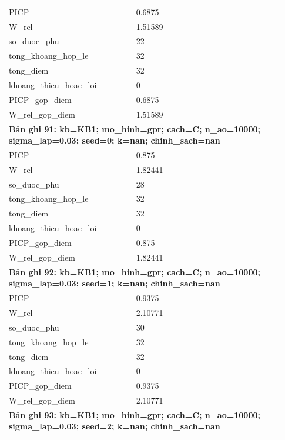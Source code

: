 \begin{longtable}{p{0.43\linewidth}p{0.50\linewidth}}
PICP & 0.6875 \\
W\_\allowbreak rel & 1.51589 \\
so\_\allowbreak duoc\_\allowbreak phu & 22 \\
tong\_\allowbreak khoang\_\allowbreak hop\_\allowbreak le & 32 \\
tong\_\allowbreak diem & 32 \\
khoang\_\allowbreak thieu\_\allowbreak hoac\_\allowbreak loi & 0 \\
PICP\_\allowbreak gop\_\allowbreak diem & 0.6875 \\
W\_\allowbreak rel\_\allowbreak gop\_\allowbreak diem & 1.51589 \\
\midrule
\multicolumn{2}{p{0.95\linewidth}}{\textbf{Bản ghi 91: kb=KB1; mo\_hinh=gpr; cach=C; n\_ao=10000; sigma\_lap=0.03; seed=0; k=nan; chinh\_sach=nan}} \\
PICP & 0.875 \\
W\_\allowbreak rel & 1.82441 \\
so\_\allowbreak duoc\_\allowbreak phu & 28 \\
tong\_\allowbreak khoang\_\allowbreak hop\_\allowbreak le & 32 \\
tong\_\allowbreak diem & 32 \\
khoang\_\allowbreak thieu\_\allowbreak hoac\_\allowbreak loi & 0 \\
PICP\_\allowbreak gop\_\allowbreak diem & 0.875 \\
W\_\allowbreak rel\_\allowbreak gop\_\allowbreak diem & 1.82441 \\
\midrule
\multicolumn{2}{p{0.95\linewidth}}{\textbf{Bản ghi 92: kb=KB1; mo\_hinh=gpr; cach=C; n\_ao=10000; sigma\_lap=0.03; seed=1; k=nan; chinh\_sach=nan}} \\
PICP & 0.9375 \\
W\_\allowbreak rel & 2.10771 \\
so\_\allowbreak duoc\_\allowbreak phu & 30 \\
tong\_\allowbreak khoang\_\allowbreak hop\_\allowbreak le & 32 \\
tong\_\allowbreak diem & 32 \\
khoang\_\allowbreak thieu\_\allowbreak hoac\_\allowbreak loi & 0 \\
PICP\_\allowbreak gop\_\allowbreak diem & 0.9375 \\
W\_\allowbreak rel\_\allowbreak gop\_\allowbreak diem & 2.10771 \\
\midrule
\multicolumn{2}{p{0.95\linewidth}}{\textbf{Bản ghi 93: kb=KB1; mo\_hinh=gpr; cach=C; n\_ao=10000; sigma\_lap=0.03; seed=2; k=nan; chinh\_sach=nan}} \\

\end{longtable}
